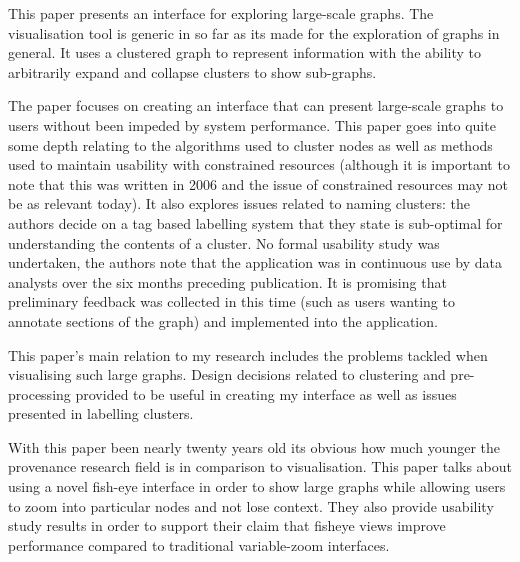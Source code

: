 
This paper presents an interface for exploring large-scale graphs. The visualisation tool is generic in so far as its made for the exploration of graphs in general. It uses a clustered graph to represent information with the ability to arbitrarily expand and collapse clusters to show sub-graphs.

The paper focuses on creating an interface that can present large-scale graphs to users without been impeded by system performance. This paper goes into quite some depth relating to the algorithms used to cluster nodes as well as methods used to maintain usability with constrained resources (although it is important to note that this was written in 2006 and the issue of constrained resources may not be as relevant today). It also explores issues related to naming clusters: the authors decide on a tag based labelling system that they state is sub-optimal for understanding the contents of a cluster. No formal usability study was undertaken, the authors note that the application was in continuous use by data analysts over the six months preceding publication. It is promising that preliminary feedback was collected in this time (such as users wanting to annotate sections of the graph) and implemented into the application.

This paper's main relation to my research includes the problems tackled when visualising such large graphs. Design decisions related to clustering and pre-processing provided to be useful in creating my interface as well as issues presented in labelling clusters. 


With this paper been nearly twenty years old its obvious how much younger the provenance research field is in comparison to visualisation. This paper talks about using a novel fish-eye interface in order to show large graphs while allowing users to zoom into particular nodes and not lose context. They also provide usability study results in order to support their claim that fisheye views improve performance compared to traditional variable-zoom interfaces.

